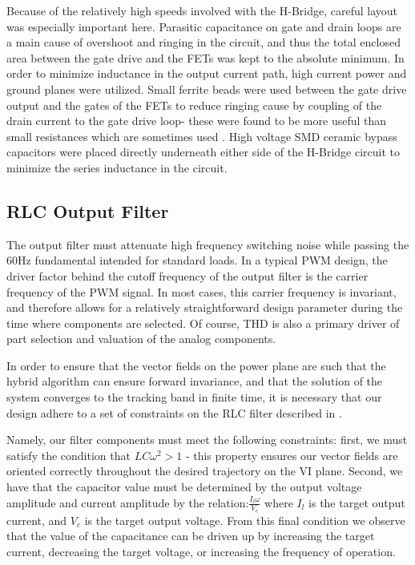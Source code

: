 Because of the relatively high speeds involved with the H-Bridge, careful layout was especially important here. Parasitic capacitance on gate and drain loops are a main cause of overshoot and ringing in the circuit, and thus the total enclosed area between the gate drive and the FETs was kept to the absolute minimum. In order to minimize inductance in the output current path, high current power and ground planes were utilized. Small ferrite beads were used between the gate drive output and the gates of the FETs to reduce ringing cause by coupling of the drain current to the gate drive loop- these were found to be more useful than small resistances which are sometimes used \cite{transphorm}. High voltage SMD ceramic bypass capacitors were placed directly underneath either side of the H-Bridge circuit to minimize the series inductance in the circuit. 
  
\subsection{RLC Output Filter}
The output filter must attenuate high frequency switching noise while passing the 60Hz fundamental intended for standard loads. In a typical PWM design, the driver factor behind the cutoff frequency of the output filter is the carrier frequency of the PWM signal. In most cases, this carrier frequency is invariant, and therefore allows for a relatively straightforward design parameter during the time where components are selected. Of course, THD is also a primary driver of part selection and valuation of the analog components.


In order to ensure that the vector fields on the power plane are such that the hybrid algorithm can ensure forward invariance, and that the solution of the system converges to the tracking band in finite time,  it is necessary that our design adhere to a set of constraints on the RLC filter described in \cite{ricardo}. 

Namely, our filter components must meet the following constraints: first, we must satisfy the condition that $LC\omega^2>1$ - this property ensures our vector fields are oriented correctly throughout the desired trajectory on the VI plane. Second, we have that the capacitor value must be determined by the output voltage amplitude and current amplitude by the relation:$\frac{I_l\omega}{V_c}$ where $I_l$ is the target output current, and $V_c$ is the target output voltage. From this final condition we observe that the value of the capacitance can be driven up by increasing the target current, decreasing the target voltage, or increasing the frequency of operation. 

